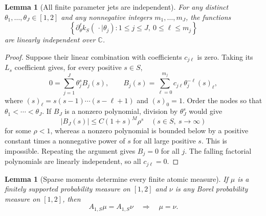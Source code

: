 \documentclass[11pt,letterpaper]{article}
\newtheorem{lemma}[theorem]{Lemma}
\theoremstyle{definition}
\theoremstyle{remark}
\newcommand{\1}{\mathbf 1}
\begin{document}
\begin{lemma}[All finite parameter jets are independent]
\label{p11:lem:interval-jets}
For any distinct $\theta_1,\ldots,\theta_J\in[1,2]$ and any nonnegative
integers $m_1,\ldots,m_J$, the functions
\[
 \left\{\partial_\theta^\ell k_S(\,\cdot\mid\theta_j):
        1\leq j\leq J,\ 0\leq\ell\leq m_j\right\}
\]
are linearly independent over $\mathbb C$.
\end{lemma}

\begin{proof}
Suppose their linear combination with coefficients $c_{j\ell}$ is
zero.  Taking its $L_s$ coefficient gives, for every positive $s\in S$,
\[
 0=\sum_{j=1}^J\theta_j^s B_j(s),\qquad
 B_j(s)=\sum_{\ell=0}^{m_j}c_{j\ell}\theta_j^{-\ell}(s)_\ell,
\]
where $(s)_\ell=s(s-1)\cdots(s-\ell+1)$ and $(s)_0=1$.
Order the nodes so that $\theta_1<\cdots<\theta_J$.  If $B_J$ is a
nonzero polynomial, division by $\theta_J^s$ would give
\[
 |B_J(s)|\leq C(1+s)^M\rho^s
 \quad (s\in S,\ s\longrightarrow\infty)
\]
for some $\rho<1$, whereas a nonzero polynomial is bounded below by a
positive constant times a nonnegative power of $s$ for all large
positive $s$.  This is impossible.  Repeating the argument gives
$B_j=0$ for all $j$.  The falling factorial polynomials are linearly
independent, so all $c_{j\ell}=0$.
\end{proof}

\begin{lemma}[Sparse moments determine every finite atomic measure]
\label{p11:lem:interval-atomic}
If $\mu$ is a finitely supported probability measure on $[1,2]$ and
$\nu$ is any Borel probability measure on $[1,2]$, then
\[
 A_{1,S}\mu=A_{1,S}\nu\quad\Longrightarrow\quad\mu=\nu.
\]
\end{lemma}
\end{document}
